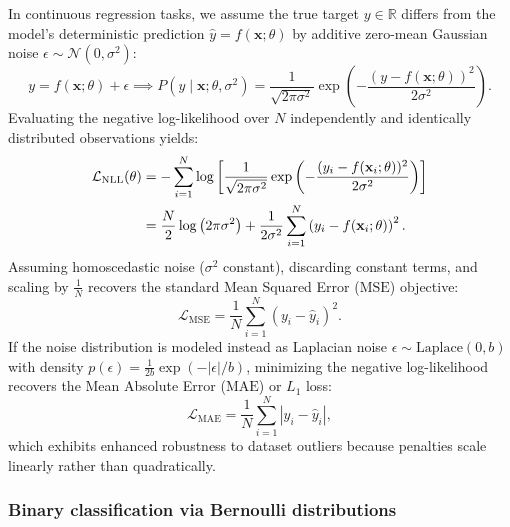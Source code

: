\documentclass[../../main.tex]{subfiles}
\begin{document}
In continuous regression tasks, we assume the true target $y \in \mathbb{R}$ differs from the model's deterministic prediction $\hat{y} = f(\mathbf{x}; \theta)$ by additive zero-mean Gaussian noise $\epsilon \sim \mathcal{N}(0, \sigma^2)$:
\begin{equation}
y = f(\mathbf{x}; \theta) + \epsilon \implies P(y \mid \mathbf{x}; \theta, \sigma^2) = \frac{1}{\sqrt{2\pi\sigma^2}} \exp\left( -\frac{(y - f(\mathbf{x}; \theta))^2}{2\sigma^2} \right).
\end{equation}
Evaluating the negative log-likelihood over $N$ independently and identically distributed observations yields:
\begin{align}
\mathcal{L}_{\text{NLL}}(\theta) &= -\sum_{i=1}^N \log \left[ \frac{1}{\sqrt{2\pi\sigma^2}} \exp\left( -\frac{(y_i - f(\mathbf{x}_i; \theta))^2}{2\sigma^2} \right) \right] \notag \\
&= \frac{N}{2} \log\left(2\pi\sigma^2\right) + \frac{1}{2\sigma^2} \sum_{i=1}^N \left( y_i - f(\mathbf{x}_i; \theta) \right)^2.
\end{align}
Assuming homoscedastic noise ($\sigma^2$ constant), discarding constant terms, and scaling by $\frac{1}{N}$ recovers the standard Mean Squared Error ($\text{MSE}$) objective:
\begin{equation}
\mathcal{L}_{\text{MSE}} = \frac{1}{N} \sum_{i=1}^N \left( y_i - \hat{y}_i \right)^2.
\end{equation}
If the noise distribution is modeled instead as Laplacian noise $\epsilon \sim \text{Laplace}(0, b)$ with density $p(\epsilon) = \frac{1}{2b}\exp(-|\epsilon|/b)$, minimizing the negative log-likelihood recovers the Mean Absolute Error ($\text{MAE}$) or $L_1$ loss:
\begin{equation}
\mathcal{L}_{\text{MAE}} = \frac{1}{N} \sum_{i=1}^N \left| y_i - \hat{y}_i \right|,
\end{equation}
which exhibits enhanced robustness to dataset outliers because penalties scale linearly rather than quadratically.

\subsubsection{Binary classification via Bernoulli distributions}
\end{document}
